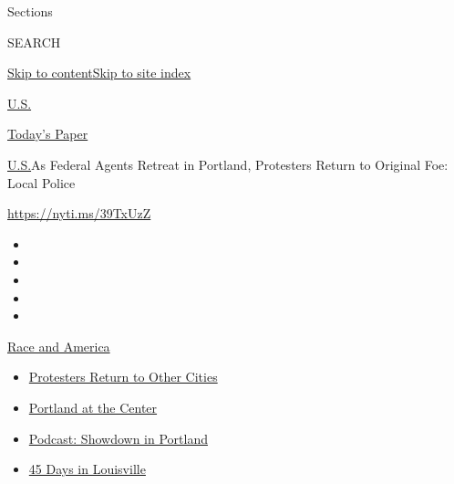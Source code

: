 Sections

SEARCH

\protect\hyperlink{site-content}{Skip to
content}\protect\hyperlink{site-index}{Skip to site index}

\href{https://www.nytimes3xbfgragh.onion/section/us}{U.S.}

\href{https://myaccount.nytimes3xbfgragh.onion/auth/login?response_type=cookie\&client_id=vi}{}

\href{https://www.nytimes3xbfgragh.onion/section/todayspaper}{Today's
Paper}

\href{/section/us}{U.S.}\textbar{}As Federal Agents Retreat in Portland,
Protesters Return to Original Foe: Local Police

\url{https://nyti.ms/39TxUzZ}

\begin{itemize}
\item
\item
\item
\item
\item
\end{itemize}

\href{https://www.nytimes3xbfgragh.onion/news-event/george-floyd-protests-minneapolis-new-york-los-angeles?action=click\&pgtype=Article\&state=default\&region=TOP_BANNER\&context=storylines_menu}{Race
and America}

\begin{itemize}
\tightlist
\item
  \href{https://www.nytimes3xbfgragh.onion/2020/07/26/us/protests-portland-seattle-trump.html?action=click\&pgtype=Article\&state=default\&region=TOP_BANNER\&context=storylines_menu}{Protesters
  Return to Other Cities}
\item
  \href{https://www.nytimes3xbfgragh.onion/2020/07/24/us/portland-oregon-protests-white-race.html?action=click\&pgtype=Article\&state=default\&region=TOP_BANNER\&context=storylines_menu}{Portland
  at the Center}
\item
  \href{https://www.nytimes3xbfgragh.onion/2020/07/23/podcasts/the-daily/portland-protests.html?action=click\&pgtype=Article\&state=default\&region=TOP_BANNER\&context=storylines_menu}{Podcast:
  Showdown in Portland}
\item
  \href{https://www.nytimes3xbfgragh.onion/interactive/2020/07/16/us/black-lives-matter-protests-louisville-breonna-taylor.html?action=click\&pgtype=Article\&state=default\&region=TOP_BANNER\&context=storylines_menu}{45
  Days in Louisville}
\end{itemize}

